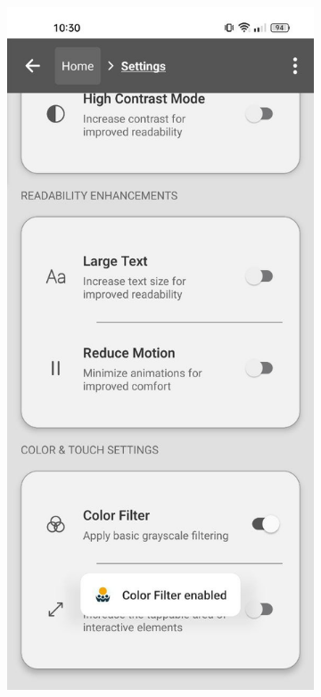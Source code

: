 \begin{figure}[ht]
    \centering
    \begin{subfigure}[b]{0.48\textwidth}
        \centering
        \includegraphics[width=\linewidth, alt={Settings screen with large text option enabled notification}]{img/settings3.jpg}

\end{subfigure}
\end{figure}
